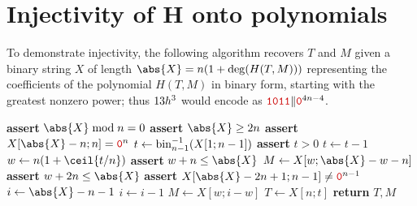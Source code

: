 \documentclass[hctr2.tex]{subfiles}
\begin{document}
\section{Injectivity of H onto polynomials}\label{injective}
To demonstrate injectivity, 
the following algorithm recovers \(T\) and \(M\) given
a binary string \(X\) of length \(\abs{X} = n (1 + \deg(H(T, M)))\)
representing the coefficients of 
the polynomial \(H(T, M)\) in binary form,
starting with the greatest nonzero power; thus
\(13h^3\) would encode as \(\binary{1011} \Concat \bino^{4n -4}\).
\begin{algorithmic}[1]
    \State \textbf{assert} \(\abs{X} \bmod n = 0\)
    \State \textbf{assert} \(\abs{X} \geq 2n\)
    \State \textbf{assert} \(X[\abs{X} - n; n] = \bino^n\)
    \State \(t \gets \operatorname{bin}^{-1}_{n-1}(X[1;n-1])\)
    \State \textbf{assert} \(t > 0\)
    \State \(t \gets t-1\)
    \State \(w \gets n(1 + \ceil{t/n})\)
        \State \textbf{assert} \(w + n \leq \abs{X}\)
        \State \(M \gets X[w;\abs{X}-w-n]\)
    \Else
        \State \textbf{assert} \(w + 2n \leq \abs{X}\)
        \State \textbf{assert} \(X[\abs{X}-2n+1; n-1] \neq \bino^{n-1}\)
        \State \(i \gets \abs{X} - n - 1\)
            \State \(i \gets i - 1\)
        \EndWhile
        \State \(M \gets X[w;i - w]\)
    \EndIf
    \State \(T \gets X[n;t]\)
    \State \textbf{return} \(T, M\)
    \EndProcedure
\end{algorithmic}
\end{document}
